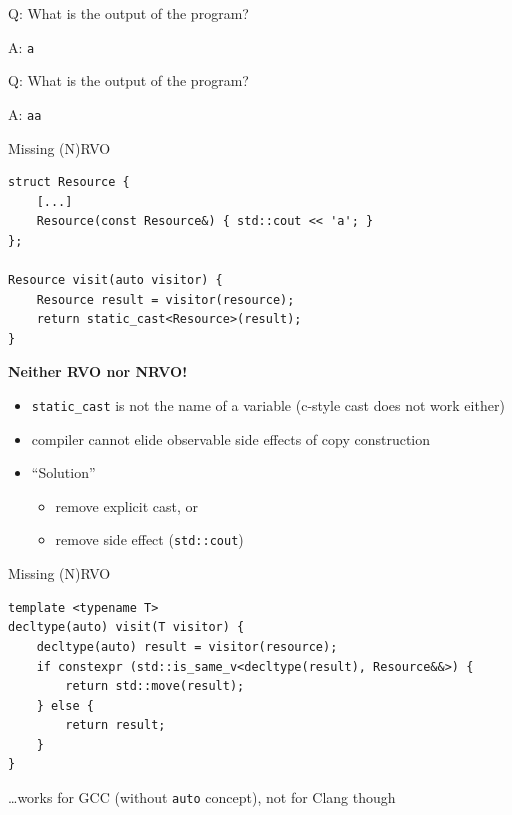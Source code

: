 \documentclass[compress,aspectratio=1610]{beamer}
\newcommand{\inputcpplisting}[1]{}
\begin{document}
\begin{frame}
    \centering
    \scalebox{5.}{\color{vertexDarkRed}$*$}
\end{frame}

\begin{frame}[fragile]{Q: What is the output of the program?}
    \inputcpplisting{snippet16a}
\end{frame}

\begin{frame}[fragile]{A: \texttt{a}}
    \inputcpplisting{snippet16a}
\end{frame}

\begin{frame}[fragile]{Q: What is the output of the program?}
    \inputcpplisting{snippet16b}
\end{frame}

\begin{frame}[fragile]{A: \texttt{aa}}
    \inputcpplisting{snippet16b}
\end{frame}

\begin{frame}[fragile]{Missing (N)RVO}
    \begin{lstlisting}
struct Resource {
    [...]
    Resource(const Resource&) { std::cout << 'a'; }
};

Resource visit(auto visitor) {
    Resource result = visitor(resource);
    return static_cast<Resource>(result);
}
    \end{lstlisting}

    \textbf{Neither RVO nor NRVO!}
    \begin{itemize}
        \item \texttt{static\_cast} is not the name of a variable (c-style cast does not work either)
        \item compiler cannot elide observable side effects of copy construction
        \item \enquote{Solution}
        \begin{itemize}
            \item remove explicit cast, or
            \item remove side effect (\texttt{std::cout})
        \end{itemize}
    \end{itemize}
\end{frame}

\begin{frame}[fragile]{Missing (N)RVO}
    \begin{lstlisting}
template <typename T>
decltype(auto) visit(T visitor) {
    decltype(auto) result = visitor(resource);
    if constexpr (std::is_same_v<decltype(result), Resource&&>) {
        return std::move(result);
    } else {
        return result;
    }
}
    \end{lstlisting}

    \hfill \ldots works for GCC (without \texttt{auto} concept), not for Clang though
\end{frame}
\end{document}
